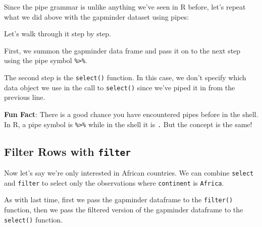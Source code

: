 \documentclass[]{book}
\newenvironment{Shaded}{\begin{snugshade}}{\end{snugshade}}
\newcommand{\KeywordTok}[1]{\textcolor[rgb]{0.13,0.29,0.53}{\textbf{#1}}}
\newcommand{\StringTok}[1]{\textcolor[rgb]{0.31,0.60,0.02}{#1}}
\newcommand{\OperatorTok}[1]{\textcolor[rgb]{0.81,0.36,0.00}{\textbf{#1}}}
\newcommand{\NormalTok}[1]{#1}
\begin{document}
Since the pipe grammar is unlike anything we've seen in R before, let's
repeat what we did above with the gapminder dataset using pipes:

\begin{Shaded}
\end{Shaded}

Let's walk through it step by step.

First, we summon the gapminder data frame and pass it on to the next
step using the pipe symbol \texttt{\%\textgreater{}\%}.

The second step is the \texttt{select()} function. In this case, we
don't specify which data object we use in the call to \texttt{select()}
since we've piped it in from the previous line.

\textbf{Fun Fact}: There is a good chance you have encountered pipes
before in the shell. In R, a pipe symbol is \texttt{\%\textgreater{}\%}
while in the shell it is \texttt{\textbar{}.} But the concept is the
same!

\subsection{\texorpdfstring{Filter Rows with
\texttt{filter}}{Filter Rows with filter}}\label{filter-rows-with-filter}

Now let's say we're only interested in African countries. We can combine
\texttt{select} and \texttt{filter} to select only the observations
where \texttt{continent} is \texttt{Africa}.

\begin{Shaded}
\end{Shaded}

As with last time, first we pass the gapminder dataframe to the
\texttt{filter()} function, then we pass the filtered version of the
gapminder dataframe to the \texttt{select()} function.
\end{document}
